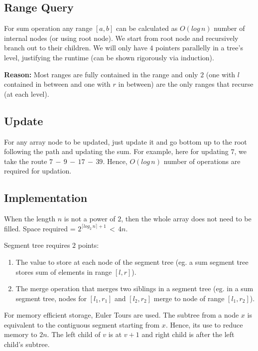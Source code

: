 \documentclass{article}
\begin{document}
	\subsection{Range Query}
	For sum operation any range $[a,b]$ can be calculated as $O(log \, n)$ number of internal nodes (or using root node). We start from root node and recursively branch out to their children. We will only have $4$ pointers parallelly in a tree's level, justifying the runtime (can be shown rigorously via induction). \newline
	
	\textbf{Reason:} Most ranges are fully contained in the range and only $2$ (one with $l$ contained in between and one with $r$ in between) are the only ranges that recurse (at each level).
	\subsection{Update}
	For any array node to be updated, just update it and go bottom up to the root following the path and updating the sum. For example, here for updating $7$, we take the route $7 \, - \, 9 \, - \, 17 \, - \, 39$. Hence, $O(log \, n)$ number of operations are required for updation.
	
	\subsection{Implementation}
	When the length $n$ is not a power of $2$, then the whole array does not need to be filled. Space required = $2^{\lceil log_2 \, n \rceil + 1} \, < \, 4n$. \newline
	
	Segment tree requires $2$ points:
	\begin{enumerate}
		\item The value to store at each node of the segment tree (eg. a sum segment tree stores sum of elements in range $[l,r]$).
		\item The merge operation that merges two siblings in a segment tree (eg. in a sum segment tree, nodes for $[l_1,r_1]$ and $[l_2,r_2]$ merge to node of range $[l_1,r_2]$).
	\end{enumerate}
	
	For memory efficient storage, Euler Tours are used. The subtree from a node $x$ is equivalent to the contiguous segment starting from $x$. Hence, its use to reduce memory to $2n$. The left child of $v$ is at $v+1$ and right child is after the left child's subtree.
	
\end{document}
